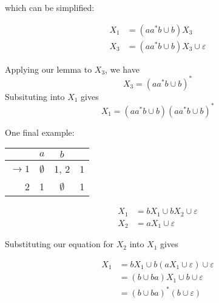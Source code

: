 which can be simplified:

\begin{align*}
      X_1 &= (aa^*b\cup b)X_3\\
      X_3 &= (aa^*b\cup b)X_3\cup\varepsilon
\end{align*}

Applying our lemma to \(X_3\), we have \[X_3={(aa^*b\cup b)}^*\] Subsituting into \(X_1\) gives \[X_1=(aa^*b\cup b){(aa^*b\cup b)}^*\] 

One final example:

\begin{center}\begin{tabular}{r c c r}
      & \(a\) & \(b\) & \\\bottomrule
      \(\to 1\) & \(\emptyset \) & 1, 2 & 1\\
            2 & 1 & \(\emptyset \) & 1\\
 \end{tabular}\end{center}

\begin{align*}
      X_1 &= bX_1\cup bX_2\cup\varepsilon \\
      X_2 &= aX_1\cup\varepsilon
\end{align*}

Substituting our equation for \(X_2\) into \(X_1\) gives 

\begin{align*}
      X_1&=bX_1\cup b(aX_1\cup\varepsilon)\cup\varepsilon \\
         &=(b\cup ba)X_1\cup b\cup\varepsilon \\
         &={(b\cup ba)}^*(b\cup\varepsilon)
\end{align*}

